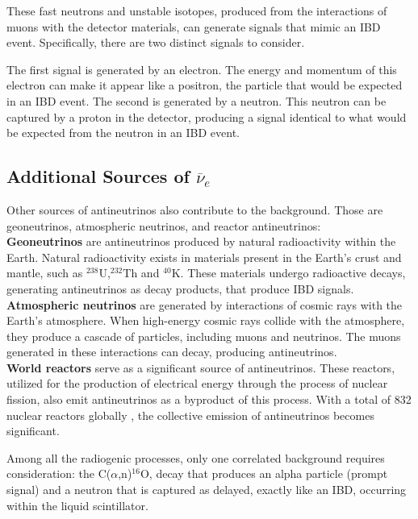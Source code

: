 These fast neutrons and unstable isotopes, produced from the interactions of muons with the detector materials, can generate signals that mimic an IBD event. Specifically, there are two distinct signals to consider.

The first signal is generated by an electron. The energy and momentum of this electron can make it appear like a positron, the particle that would be expected in an IBD event. The second is generated by a neutron. This neutron can be captured by a proton in the detector, producing a signal identical to what would be expected from the neutron in an IBD event.


\subsection*{Additional Sources of $\overline{\nu}_e$}

Other sources of antineutrinos also contribute to the background. Those are geoneutrinos, atmospheric neutrinos, and reactor antineutrinos:\\

\textbf{Geoneutrinos} are antineutrinos produced by natural radioactivity within the Earth. Natural radioactivity exists in materials present in the Earth's crust and mantle, such as $^{238}\mathrm{U}$,$^{232}\mathrm{Th}$ and $^{40}\mathrm{K}$. These materials undergo radioactive decays, generating antineutrinos as decay products, that produce IBD signals.\\

\textbf{Atmospheric neutrinos} are generated by interactions of cosmic rays with the Earth's atmosphere. When high-energy cosmic rays collide with the atmosphere, they produce a cascade of particles, including muons and neutrinos. The muons generated in these interactions can decay, producing antineutrinos.\\

\textbf{World reactors} serve as a significant source of antineutrinos. These reactors, utilized for the production of electrical energy through the process of nuclear fission, also emit antineutrinos as a byproduct of this process. With a total of 832 nuclear reactors globally \cite{word_react}, the collective emission of antineutrinos becomes significant.

Among all the radiogenic processes, only one correlated background requires consideration: the $\mathrm{C}$($\alpha$,n)$^{16}\mathrm{O}$, decay that produces an alpha particle (prompt signal) and a neutron that is captured as delayed, exactly like an IBD, occurring within the liquid scintillator.


